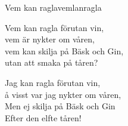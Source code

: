 \begin{song}{Vem kan ragla}{vemlanragla}
\begin{vers}
Vem kan ragla förutan vin,\\
vem är nykter om våren,\\
vem kan skilja på Bäsk och Gin,\\
utan att smaka på tåren?\\
\end{vers}
\begin{vers}
Jag kan ragla förutan vin,\\
å visst var jag nykter om våren,\\
Men ej skilja på Bäsk och Gin\\
Efter den elfte tåren!\\
\end{vers}
\end{song}
